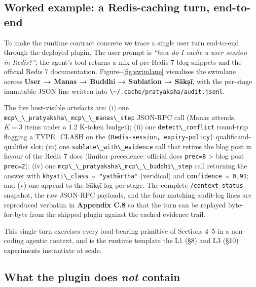 \subsection{Worked example: a Redis-caching turn, end-to-end}\label{worked-example-a-redis-caching-turn-end-to-end}

To make the runtime contract concrete we trace a single user turn end-to-end through the deployed plugin. The user prompt is \emph{``how do I cache a user session in Redis?''}; the agent's tool returns a mix of pre-Redis-7 blog snippets and the official Redis 7 documentation. Figure\textasciitilde{}\ref{fig:swimlane} visualises the swimlane across \textbf{User → Manas → Buddhi → Sublation → Sākṣī}, with the per-stage immutable JSON line written into \passthrough{\lstinline!\~/.cache/pratyaksha/audit.jsonl!}.



The five host-visible artefacts are: (i) one \passthrough{\lstinline!mcp\_\_pratyaksha\_mcp\_\_manas\_step!} JSON-RPC call (Manas attends, \(K=3\) items under a 1.2 K-token budget); (ii) one \passthrough{\lstinline!detect\_conflict!} round-trip flagging a TYPE\_CLASH on the \passthrough{\lstinline!(Redis-session, expiry-policy)!} qualificand-qualifier slot; (iii) one \passthrough{\lstinline!sublate\_with\_evidence!} call that retires the blog post in favour of the Redis 7 docs (limitor precedence: official docs \passthrough{\lstinline!prec=8!} \textgreater{} blog post \passthrough{\lstinline!prec=2!}); (iv) one \passthrough{\lstinline!mcp\_\_pratyaksha\_mcp\_\_buddhi\_step!} call returning the answer with \passthrough{\lstinline!khyati\_class = "yathārtha"!} (veridical) and \passthrough{\lstinline!confidence = 0.91!}; and (v) one append to the Sākṣī log per stage. The complete \passthrough{\lstinline!/context-status!} snapshot, the raw JSON-RPC payloads, and the four matching audit-log lines are reproduced verbatim in \textbf{Appendix C.8} so that the turn can be replayed byte-for-byte from the shipped plugin against the cached evidence trail.

This single turn exercises every load-bearing primitive of Sections 4--5 in a non-coding agentic context, and is the runtime template the L1 (§8) and L3 (§10) experiments instantiate at scale.

\subsection{\texorpdfstring{What the plugin does \emph{not} contain}{What the plugin does not contain}}\label{what-the-plugin-does-not-contain}

